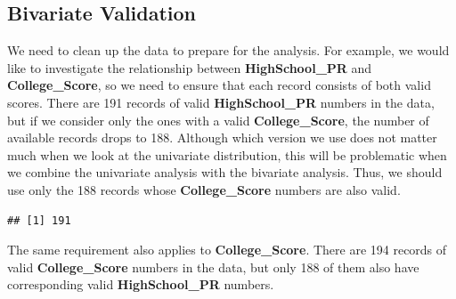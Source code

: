 \documentclass[
]{article}
\newenvironment{Shaded}{\begin{snugshade}}{\end{snugshade}}
\newcommand{\CommentTok}[1]{\textcolor[rgb]{0.56,0.35,0.01}{\textit{#1}}}
\newcommand{\DecValTok}[1]{\textcolor[rgb]{0.00,0.00,0.81}{#1}}
\newcommand{\FunctionTok}[1]{\textcolor[rgb]{0.00,0.00,0.00}{#1}}
\newcommand{\NormalTok}[1]{#1}
\newcommand{\OtherTok}[1]{\textcolor[rgb]{0.56,0.35,0.01}{#1}}
\newcommand{\SpecialCharTok}[1]{\textcolor[rgb]{0.00,0.00,0.00}{#1}}
\begin{document}
\hypertarget{bivariate-validation}{%
\subsection{Bivariate Validation}\label{bivariate-validation}}

We need to clean up the data to prepare for the analysis. For example,
we would like to investigate the relationship between
\textbf{HighSchool\_PR} and \textbf{College\_Score}, so we need to
ensure that each record consists of both valid scores. There are 191
records of valid \textbf{HighSchool\_PR} numbers in the data, but if we
consider only the ones with a valid \textbf{College\_Score}, the number
of available records drops to 188. Although which version we use does
not matter much when we look at the univariate distribution, this will
be problematic when we combine the univariate analysis with the
bivariate analysis. Thus, we should use only the 188 records whose
\textbf{College\_Score} numbers are also valid.

\begin{Shaded}
\end{Shaded}

\begin{verbatim}
## [1] 191
\end{verbatim}

The same requirement also applies to \textbf{College\_Score}. There are
194 records of valid \textbf{College\_Score} numbers in the data, but
only 188 of them also have corresponding valid \textbf{HighSchool\_PR}
numbers.

\begin{Shaded}
\end{Shaded}
\end{document}
